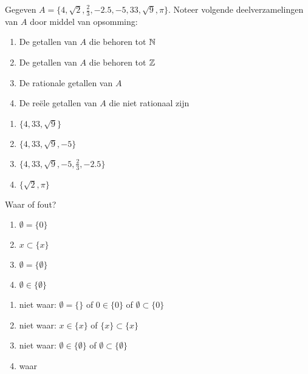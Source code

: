\begin{oef}
Gegeven $A=\{4,\sqrt{2}, \frac{2}{3}, -2.5, -5,33,\sqrt{9},\pi \}$. Noteer volgende deelverzamelingen van $A$ door middel van opsomming:
\begin{enumerate}
\item De  getallen van $A$ die behoren tot $\mathbb{N}$
\item De  getallen van $A$ die behoren tot $\mathbb{Z}$
\item De rationale getallen van $A$
\item De re\"ele getallen van $A$ die niet rationaal zijn
\end{enumerate}
\begin{opl}
\begin{enumerate}
\item $\{ 4,33,\sqrt{9}\}$
\item $\{ 4,33,\sqrt{9},-5\}$
\item $\{ 4,33,\sqrt{9},-5,\frac 23,-2.5\}$
\item $\{\sqrt{2},\pi\}$
\end{enumerate}
\end{opl}
\end{oef}



\begin{oef}
Waar of fout?
\begin{enumerate}
\item $\emptyset=\{0\}$
\item $x\subset \{x\}$
\item $\emptyset=\{\emptyset\}$
\item $\emptyset\in \{\emptyset\}$
\end{enumerate}
\begin{opl}
\begin{enumerate}
\item niet waar: $\emptyset=\{ \}$ of  $0\in \{0\}$ of $\emptyset\subset\{0\}$
\item niet waar: $x\in \{x\}$ of $\{x\}\subset \{x\}$
\item niet waar: $\emptyset\in\{\emptyset\}$ of $\emptyset\subset\{\emptyset\}$
\item waar
\end{enumerate}
\end{opl}
\end{oef}




